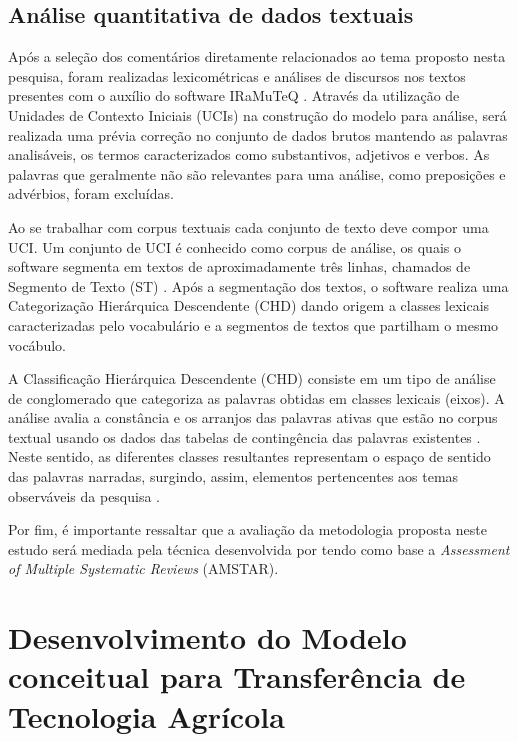 \subsection{Análise quantitativa de dados textuais}

Após a seleção dos comentários diretamente relacionados ao tema proposto nesta pesquisa, foram realizadas lexicométricas e análises de discursos nos textos presentes com o auxílio do software IRaMuTeQ \cite{conde_lexicometria_2015,da_silva_cezar_panorama_2018}. Através da utilização de Unidades de Contexto Iniciais (UCIs) na construção do modelo para análise, será realizada uma prévia correção no conjunto de dados brutos mantendo as palavras analisáveis, os termos caracterizados como substantivos, adjetivos e verbos. As palavras que geralmente não são relevantes para uma análise, como preposições e advérbios, foram excluídas.

Ao se trabalhar com corpus textuais cada conjunto de texto deve compor uma UCI. Um conjunto de UCI é conhecido como corpus de análise, os quais o software segmenta em textos de aproximadamente três linhas, chamados de Segmento de Texto (ST) \cite{fernandes_avaliacao_2018}. Após a segmentação dos textos, o software realiza uma Categorização Hierárquica Descendente (CHD) dando origem a classes lexicais caracterizadas pelo vocabulário e a segmentos de textos que partilham o mesmo vocábulo.

A Classificação Hierárquica Descendente (CHD) consiste em um tipo de análise de conglomerado que categoriza as palavras obtidas em classes lexicais (eixos). A análise avalia a constância e os arranjos das palavras ativas que estão no corpus textual usando os dados das tabelas de contingência das palavras existentes \cite{carvalho_utilizacao_2020,mendes_mapping_2019}. Neste sentido, as diferentes classes resultantes representam o espaço de sentido das palavras narradas, surgindo, assim, elementos pertencentes aos temas observáveis da pesquisa \cite{gavasso_revisao_2016}. 

Por fim, é importante ressaltar que a avaliação da metodologia proposta neste estudo será mediada pela técnica desenvolvida por  tendo como base a \textit{Assessment of Multiple Systematic Reviews} (AMSTAR).


\section{Desenvolvimento do Modelo conceitual para Transferência de Tecnologia Agrícola}

